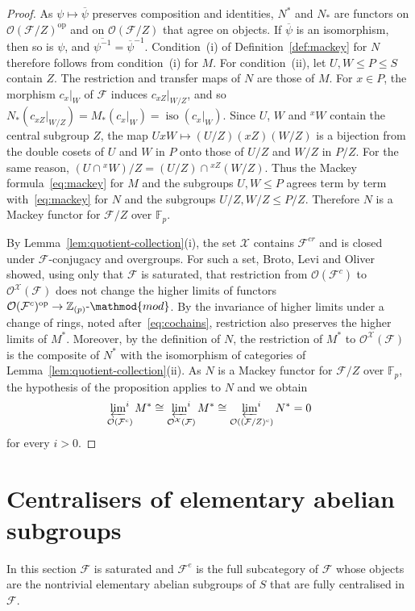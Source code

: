 \documentclass[10pt]{amsart}
\theoremstyle{definition}
\numberwithin{equation}{section}
\renewcommand{\le}{\leqslant}
\newcommand{\F}{\mathcal F}
\newcommand{\Op}{\mathcal O}
\newcommand{\limi}[2]{\mathop{\varprojlim\nolimits^{#1}}_{#2}}
\begin{document}
\begin{proof}
As $\psi\mapsto\overline\psi$ preserves composition and identities, $N^*$ and $N_*$ are functors on $\Op(\F/Z)^{\mathrm{op}}$ and on $\Op(\F/Z)$ that agree on objects.
If $\overline\psi$ is an isomorphism, then so is $\psi$, and $\overline{\psi^{-1}}=\overline\psi^{-1}$.
Condition~(i) of Definition~\ref{def:mackey} for $N$ therefore follows from condition~(i) for $M$.
For condition~(ii), let $U,W\le P\le S$ contain $Z$.
The restriction and transfer maps of $N$ are those of $M$.
For $x\in P$, the morphism $c_x|_W$ of $\F$ induces $c_{xZ}|_{W/Z}$, and so $N_*(c_{xZ}|_{W/Z})=M_*(c_x|_W)=\operatorname{iso}(c_x|_W)$.
Since $U$, $W$ and ${}^xW$ contain the central subgroup $Z$, the map $UxW\mapsto(U/Z)(xZ)(W/Z)$ is a bijection from the double cosets of $U$ and $W$ in $P$ onto those of $U/Z$ and $W/Z$ in $P/Z$.
For the same reason, $(U\cap{}^xW)/Z=(U/Z)\cap{}^{xZ}(W/Z)$.
Thus the Mackey formula~\eqref{eq:mackey} for $M$ and the subgroups $U,W\le P$ agrees term by term with~\eqref{eq:mackey} for $N$ and the subgroups $U/Z,W/Z\le P/Z$.
Therefore $N$ is a Mackey functor for $\F/Z$ over $\mathbb{F}_p$.

By Lemma~\ref{lem:quotient-collection}(i), the set $\mathcal X$ contains $\F^{cr}$ and is closed under $\F$-conjugacy and overgroups.
For such a set, Broto, Levi and Oliver~\cite[proof of Corollary~3.6]{BLO} showed, using only that $\F$ is saturated, that restriction from $\Op(\F^c)$ to $\Op^{\mathcal X}(\F)$ does not change the higher limits of functors $\Op(\F^c)^{\mathrm{op}}\to\mathbb{Z}_{(p)}\text{-}\mathmod{mod}$. By the invariance of higher limits under a change of rings, noted after~\eqref{eq:cochains}, restriction also preserves the higher limits of $M^*$.
Moreover, by the definition of $N$, the restriction of $M^*$ to $\Op^{\mathcal X}(\F)$ is the composite of $N^*$ with the isomorphism of categories of Lemma~\ref{lem:quotient-collection}(ii).
As $N$ is a Mackey functor for $\F/Z$ over $\mathbb{F}_p$, the hypothesis of the proposition applies to $N$ and we obtain
\[
\limi{i}{\Op(\F^c)}M^*\cong\limi{i}{\Op^{\mathcal X}(\F)}M^*\cong\limi{i}{\Op((\F/Z)^c)}N^*=0
\]
for every $i>0$.
\end{proof}
\section{Centralisers of elementary abelian subgroups}
In this section $\F$ is saturated and $\F^e$ is the full subcategory of $\F$ whose objects are the nontrivial elementary abelian subgroups of $S$ that are fully centralised in $\F$.
\end{document}
